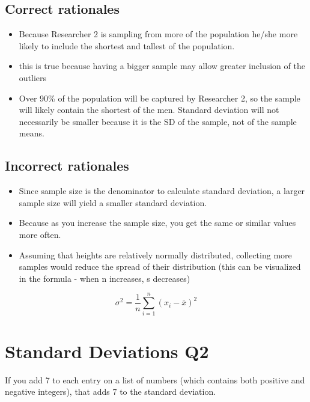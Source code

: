\documentclass[letterpaper,9pt,twoside,printwatermark=false]{pinp}
\providecommand{\tightlist}{%
  \setlength{\itemsep}{0pt}\setlength{\parskip}{0pt}}
\begin{document}
\hypertarget{correct-rationales-3}{%
\subsection{Correct rationales}\label{correct-rationales-3}}

\begin{itemize}
\tightlist
\item
  Because Researcher 2 is sampling from more of the population he/she
  more likely to include the shortest and tallest of the population.
\item
  this is true because having a bigger sample may allow greater
  inclusion of the outliers
\item
  Over 90\% of the population will be captured by Researcher 2, so the
  sample will likely contain the shortest of the men. Standard deviation
  will not necessarily be smaller because it is the SD of the sample,
  not of the sample means.
\end{itemize}

\hypertarget{incorrect-rationales-3}{%
\subsection{Incorrect rationales}\label{incorrect-rationales-3}}

\begin{itemize}
\tightlist
\item
  Since sample size is the denominator to calculate standard deviation,
  a larger sample size will yield a smaller standard deviation.
\item
  Because as you increase the sample size, you get the same or similar
  values more often.
\item
  Assuming that heights are relatively normally distributed, collecting
  more samples would reduce the spread of their distribution (this can
  be visualized in the formula - when n increases, s decreases)
\end{itemize}

\[
\sigma^2 = \frac{1}{n} \sum_{i=1}^n (x_i - \bar{x})^2
\]

\hypertarget{standard-deviations-q2}{%
\section{Standard Deviations Q2}\label{standard-deviations-q2}}

If you add 7 to each entry on a list of numbers (which contains both
positive and negative integers), that adds 7 to the standard deviation.
\end{document}
